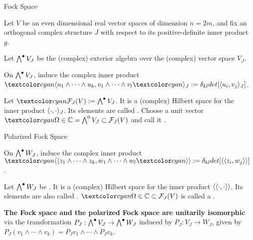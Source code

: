 \begin{frame}{Fock Space} %

    Let $V$ be an even dimensional real vector spaces of dimension $n = 2m$, and fix an orthogonal complex structure $J$ with respect to its positive-definite inner product $g$.
    
    Let $\bigwedge^\bullet V_J$ be the (complex) exterior algebra over the (complex) vector space $V_J$.
    
    On $\bigwedge^\bullet V_J$, induce the complex inner product $\defn{\bra} u_1 \wedge \cdots \wedge u_k, v_1 \wedge \cdots \wedge v_l \defn{\ket_J} := \delta_{kl} det[\bra u_i, v_j \ket_J]$.
    
    \begin{definition}
    Let  $\defn{\mathcal F_J(V)} := \extv_J$. It is a (complex) Hilbert space for the inner product $\langle \cdot, \cdot \rangle_J$. Its elements are called . Choose a unit vector $\defn{\Omega} \in \CC = \bigwedge^0 V_J \subset \fjv$ and call it .
    \end{definition}

\end{frame}

\begin{frame}{Polarized Fock Space} %

    On $\bigwedge^\bullet W_J$, induce the complex inner product $\defn{\bbra} z_1 \wedge \cdots \wedge z_k, w_1 \wedge \cdots \wedge w_l \defn{\kket} := \delta_{kl} det[\bbra z_i, w_j \kket]$.
    
    \begin{definition}
    Let $\bigwedge^\bullet W_J$ be . It is a (complex) Hilbert space for the inner product $\langle\langle \cdot, \cdot \rangle\rangle$. Its elements are also called . $\defn{\Omega} \in \CC \subset \fjv$ is called a .
    \end{definition}
    
    \textbf{The Fock space and the polarized Fock space are unitarily isomorphic} via the transformation $P_J : \bigwedge^\bullet V_J \to \bigwedge^\bullet W_J$ induced by $P_J:V_J \to W_J$, given by $P_J(v_1 \wedge \cdots \wedge v_k) = P_Jv_1 \wedge \cdots \wedge P_Jv_k$.
    
\end{frame}

